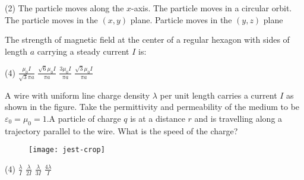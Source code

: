 \begin{enumerate}
\begin{minipage}{\textwidth}
\end{minipage}
\begin{tasks}(2)
	\task[\textbf{A.}] The particle moves along the $x$-axis.
	\task[\textbf{B.}]The particle moves in a circular orbit.
	\task[\textbf{C.}]The particle moves in the $(x, y)$ plane.
	\task[\textbf{D.}] Particle moves in the $(y, z)$ plane
\end{tasks}
\begin{minipage}{\textwidth}
	\item The strength of magnetic field at the center of a regular hexagon with sides of length $a$ carrying a steady current $I$ is:
\end{minipage}
\begin{tasks}(4)
	\task[\textbf{A.}] $\frac{\mu_{0} I}{\sqrt{3} \pi a}$ 
	\task[\textbf{B.}]$\frac{\sqrt{6} \mu_{0} I}{\pi a}$
	\task[\textbf{C.}]$\frac{3 \mu_{0} I}{\pi a}$
	\task[\textbf{D.}]$\frac{\sqrt{3} \mu_{0} I}{\pi a}$
\end{tasks}
\begin{minipage}{\textwidth}
	\item A wire with uniform line charge density $\lambda$ per unit length carries a current $I$ as shown in the figure. Take the permittivity and permeability of the medium to be $\varepsilon_{0}=\mu_{0}=1 . \mathrm{A}$ particle of charge $q$ is at a distance $r$ and is travelling along a trajectory parallel to the wire. What is the speed of the charge?
	\begin{figure}[H]
		\centering
		\texttt{[image: jest-crop]}
	\end{figure}
\end{minipage}
\begin{tasks}(4)
	\task[\textbf{A.}] $\frac{\lambda}{I}$ 
	\task[\textbf{B.}]$\frac{\lambda}{2 I}$
	\task[\textbf{C.}]$\frac{\lambda}{3 I}$
	\task[\textbf{D.}]$\frac{4 \lambda}{I}$
\end{tasks}
\end{enumerate}

